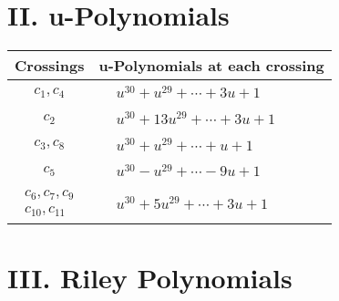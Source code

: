 \documentclass[1p]{elsarticle_modified}
\theoremstyle{definition}
\begin{document}
\centering \section*{ II. u-Polynomials}
\begin{tabular}{m{50pt}|m{274pt}}
Crossings & \hspace{64pt}u-Polynomials at each crossing \\
\hline $$\begin{aligned}c_{1},c_{4}\end{aligned}$$&$\begin{aligned}
&u^{30}+u^{29}+\cdots+3 u+1
\end{aligned}$\\
\hline $$\begin{aligned}c_{2}\end{aligned}$$&$\begin{aligned}
&u^{30}+13 u^{29}+\cdots+3 u+1
\end{aligned}$\\
\hline $$\begin{aligned}c_{3},c_{8}\end{aligned}$$&$\begin{aligned}
&u^{30}+u^{29}+\cdots+u+1
\end{aligned}$\\
\hline $$\begin{aligned}c_{5}\end{aligned}$$&$\begin{aligned}
&u^{30}- u^{29}+\cdots-9 u+1
\end{aligned}$\\
\hline $$\begin{aligned}c_{6},c_{7},c_{9}\\c_{10},c_{11}\end{aligned}$$&$\begin{aligned}
&u^{30}+5 u^{29}+\cdots+3 u+1
\end{aligned}$\\
\hline
\end{tabular}\newpage\renewcommand{\arraystretch}{1}
\centering \section*{ III. Riley Polynomials}
\end{document}
